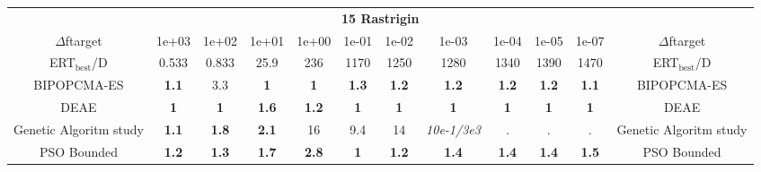 \begin{tabular}{cccccccccccc}
 & \multicolumn{10}{c}{{\normalsize \textbf{15 Rastrigin}}}\\
$\Delta$ftarget& 1e+03& 1e+02& 1e+01& 1e+00& 1e-01& 1e-02& 1e-03& 1e-04& 1e-05& 1e-07 & $\Delta$ftarget \\
ERT$_{\textrm{best}}$/D& 0.533& 0.833& 25.9& 236& 1170& 1250& 1280& 1340& 1390& 1470 & ERT$_{\textrm{best}}$/D \\
\hline
BIPOPCMA-ES & \textbf{1.1} & 3.3 & \textbf{1} & \textbf{1} & \textbf{1.3} & \textbf{1.2} & \textbf{1.2} & \textbf{1.2} & \textbf{1.2} & \textbf{1.1} & BIPOPCMA-ES \cite{add_an_entry_for_BIPOPCMA-ES_in_bbob.bib}\\
DEAE & \textbf{1} & \textbf{1} & \textbf{1.6} & \textbf{1.2} & \textbf{1} & \textbf{1} & \textbf{1} & \textbf{1} & \textbf{1} & \textbf{1} & DEAE \cite{add_an_entry_for_DEAE_in_bbob.bib}\\
Genetic Algoritm study & \textbf{1.1} & \textbf{1.8} & \textbf{2.1} & 16 & 9.4 & 14 & \textit{10e-1}\textit{/3e3} & . & . & . & Genetic Algoritm study \cite{add_an_entry_for_Genetic Algoritm study_in_bbob.bib}\\
PSO Bounded & \textbf{1.2} & \textbf{1.3} & \textbf{1.7} & \textbf{2.8} & \textbf{1} & \textbf{1.2} & \textbf{1.4} & \textbf{1.4} & \textbf{1.4} & \textbf{1.5} & PSO Bounded \cite{add_an_entry_for_PSO Bounded_in_bbob.bib}
\end{tabular}
